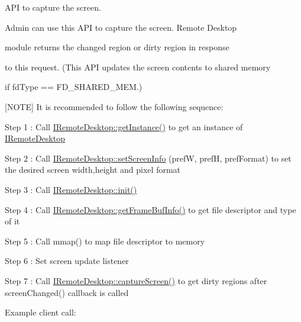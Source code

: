 \-A\-P\-I to capture the screen. 

\-Admin can use this \-A\-P\-I to capture the screen. \-Remote \-Desktop

module returns the changed region or dirty region in response

to this request. (\-This \-A\-P\-I updates the screen contents to shared memory

if fd\-Type == \-F\-D\-\_\-\-S\-H\-A\-R\-E\-D\-\_\-\-M\-E\-M.)\par


\mbox{[}\-N\-O\-T\-E\mbox{]} \-It is recommended to follow the following sequence\-:\par


\-Step 1 \-: \-Call \hyperlink{classknoxremotedesktop_1_1IRemoteDesktop_a86eefbec946d605470af069999763f74}{\-I\-Remote\-Desktop\-::get\-Instance()} to get an instance of \hyperlink{classknoxremotedesktop_1_1IRemoteDesktop}{\-I\-Remote\-Desktop}\par


\-Step 2 \-: \-Call \hyperlink{classknoxremotedesktop_1_1IRemoteDesktop_aeb13652779ac87ce9de9a8155f6dc60b}{\-I\-Remote\-Desktop\-::set\-Screen\-Info} (pref\-W, pref\-H, pref\-Format) to set the desired screen width,height and pixel format\par


\-Step 3 \-: \-Call \hyperlink{classknoxremotedesktop_1_1IRemoteDesktop_a7bed40d98c61713a69cf1dad8b37beae}{\-I\-Remote\-Desktop\-::init()}\par


\-Step 4 \-: \-Call \hyperlink{classknoxremotedesktop_1_1IRemoteDesktop_a57d5432823adfd7cfb72441469ccc98e}{\-I\-Remote\-Desktop\-::get\-Frame\-Buf\-Info()} to get file descriptor and type of it\par


\-Step 5 \-: \-Call mmap() to map file descriptor to memory\par


\-Step 6 \-: \-Set screen update listener\par


\-Step 7 \-: \-Call \hyperlink{classknoxremotedesktop_1_1IRemoteDesktop_a0ab5a0cf162a91c5e69abeed90f8ba09}{\-I\-Remote\-Desktop\-::capture\-Screen()} to get dirty regions after screen\-Changed() callback is called\par


\-Example client call\-:


\begin{DoxyPre}\end{DoxyPre}




